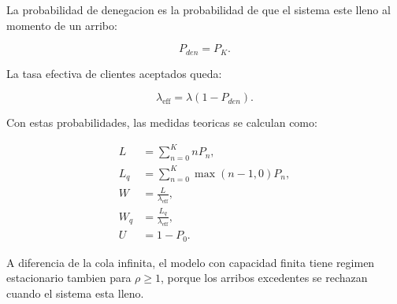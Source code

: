 La probabilidad de denegacion es la probabilidad de que el sistema este lleno al momento de un arribo:

\begin{equation}
    P_{den} = P_K.
\end{equation}

La tasa efectiva de clientes aceptados queda:

\begin{equation}
    \lambda_{\mathrm{eff}} = \lambda(1-P_{den}).
\end{equation}

Con estas probabilidades, las medidas teoricas se calculan como:

\begin{align}
    L &= \sum_{n=0}^{K} n P_n, \\
    L_q &= \sum_{n=0}^{K} \max(n-1,0) P_n, \\
    W &= \frac{L}{\lambda_{\mathrm{eff}}}, \\
    W_q &= \frac{L_q}{\lambda_{\mathrm{eff}}}, \\
    U &= 1-P_0.
\end{align}

A diferencia de la cola infinita, el modelo con capacidad finita tiene regimen estacionario tambien para $\rho \geq 1$, porque los arribos excedentes se rechazan cuando el sistema esta lleno.
